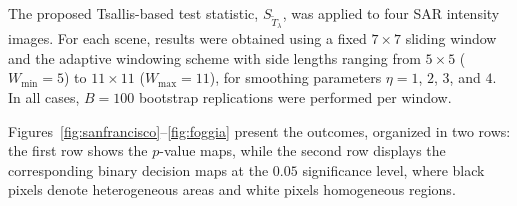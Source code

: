 \documentclass[
  lettersize  journal,
]{IEEEtran}%
\begin{document}
The proposed Tsallis-based test statistic,
\(S_{\widetilde{T}_{\lambda}}\), was applied to four SAR intensity
images. For each scene, results were obtained using a fixed \(7\times7\)
sliding window and the adaptive windowing scheme with side lengths
ranging from \(5\times5\) (\(W_{\min}=5\)) to \(11\times11\)
(\(W_{\max}=11\)), for smoothing parameters \(\eta=1\), \(2\), \(3\),
and \(4\). In all cases, \(B=100\) bootstrap replications were performed
per window.

Figures~\ref{fig:sanfrancisco}--\ref{fig:foggia} present the outcomes,
organized in two rows: the first row shows the \(p\)-value maps, while
the second row displays the corresponding binary decision maps at the
\(0.05\) significance level, where black pixels denote heterogeneous
areas and white pixels homogeneous regions.

\setlength{\dblfloatsep}{4pt}      
\setlength{\dbltextfloatsep}{4pt}  
\setlength{\textfloatsep}{4pt}
\captionsetup{font=footnotesize}
\captionsetup[sub]{aboveskip=1pt,belowskip=1pt}
\end{document}
